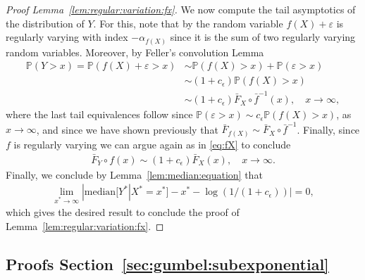 \documentclass{statsoc}
\theoremstyle{break}
\renewcommand{\P}{\mathbb P}
\def\M{\text{median}}
\newcommand{\beao}{\begin{eqnarray*}}
\newcommand{\eeao}{\end{eqnarray*}\noindent}
\begin{document}
\begin{proof}[Proof Lemma~\ref{lem:regular:variation:fx}]
	\par 
	We now compute the tail asymptotics of the distribution of $Y$. 
	For this, 
	note that by \citet[Lemma 3.1(3)]{mikosch2014modeling} the random variable $f(X) + \varepsilon$ is regularly varying with index $-\alpha_{f(X)}$ since it is the sum of two regularly varying random variables. 
	Moreover, by Feller's convolution Lemma \cite[Lemma 1.3.1]{mikosch2014modeling}
	\begin{align*}
		\P( Y > x )  = \P(f(X) + \varepsilon > x) &\sim \P(f(X) > x ) + \P(\varepsilon > x)\\
		&\sim (1+c_\epsilon)\P(f(X) > x )\\
		& \sim (1+c_\epsilon) \bar F_X \circ \bar f^{-1} (x), \quad x\to \infty,
	\end{align*} 	
	where the last tail equivalences follow since $\P(\varepsilon > x) \sim c_\epsilon \P(f(X) > x)$, as $x \to \infty$, and since we have shown
	previously that $\bar F_{f(X)} \sim \bar F_X \circ \bar f^{-1} $. 
	Finally, since $f$ is regularly varying we can argue again as in \eqref{eq:fX} to conclude 
	\beao 
	\bar F_{Y} \circ f(x) \sim (1+ c_\epsilon) \bar F_X(x), \quad x \to \infty. 
	\eeao 
	Finally, we conclude by Lemma~\ref{lem:median:equation} that
	 \beao 
	\lim_{x^* \to \infty }|\M[Y^* | X^* = x^*] - x^* - \log(1/(1+c_\epsilon))|  = 0,
	\eeao 
	which gives the desired result to conclude the proof of Lemma~\ref{lem:regular:variation:fx}. 
	 \end{proof}


\subsection{Proofs Section~\ref{sec:gumbel:subexponential}}\label{proof:sec:asymptotic:dep:mod:2}

 
\end{document}

